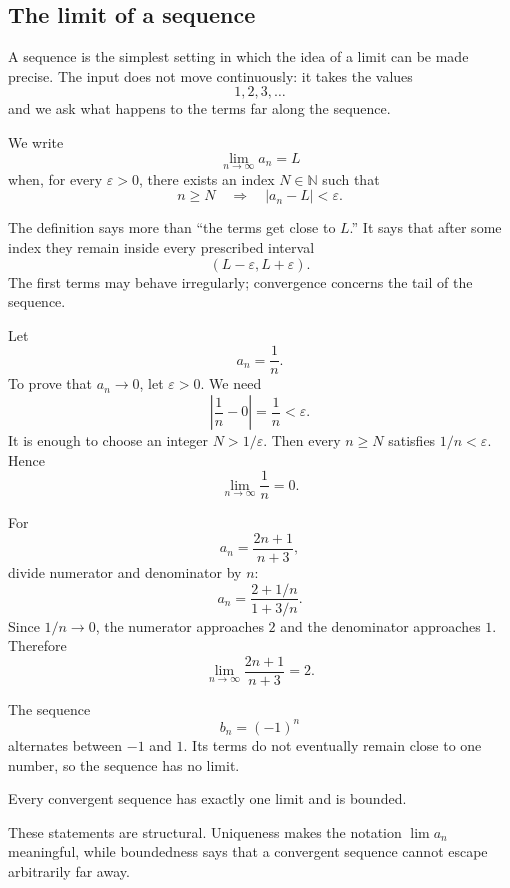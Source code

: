 \subsection{The limit of a sequence}

A sequence is the simplest setting in which the idea of a limit can be made precise. The input does not move continuously: it takes the values
\[
1,2,3,\ldots
\]
and we ask what happens to the terms far along the sequence.

\begin{definitionbox}
We write
\[
\lim_{n\to\infty}a_n=L
\]
when, for every \(\varepsilon>0\), there exists an index \(N\in\mathbb N\) such that
\[
n\ge N \quad\Longrightarrow\quad |a_n-L|<\varepsilon.
\]
\end{definitionbox}

The definition says more than ``the terms get close to \(L\).'' It says that after some index they remain inside every prescribed interval
\[
(L-\varepsilon,L+\varepsilon).
\]
The first terms may behave irregularly; convergence concerns the tail of the sequence.

\begin{examplebox}
Let
\[
a_n=\frac1n.
\]
To prove that \(a_n\to0\), let \(\varepsilon>0\). We need
\[
\left|\frac1n-0\right|=\frac1n<\varepsilon.
\]
It is enough to choose an integer \(N>1/\varepsilon\). Then every \(n\ge N\) satisfies \(1/n<\varepsilon\). Hence
\[
\lim_{n\to\infty}\frac1n=0.
\]
\end{examplebox}

\begin{examplebox}
For
\[
a_n=\frac{2n+1}{n+3},
\]
divide numerator and denominator by \(n\):
\[
a_n=\frac{2+1/n}{1+3/n}.
\]
Since \(1/n\to0\), the numerator approaches \(2\) and the denominator approaches \(1\). Therefore
\[
\lim_{n\to\infty}\frac{2n+1}{n+3}=2.
\]
\end{examplebox}

\begin{examplebox}
The sequence
\[
b_n=(-1)^n
\]
alternates between \(-1\) and \(1\). Its terms do not eventually remain close to one number, so the sequence has no limit.
\end{examplebox}

\begin{theorembox}
Every convergent sequence has exactly one limit and is bounded.
\end{theorembox}

These statements are structural. Uniqueness makes the notation \(\lim a_n\) meaningful, while boundedness says that a convergent sequence cannot escape arbitrarily far away.
